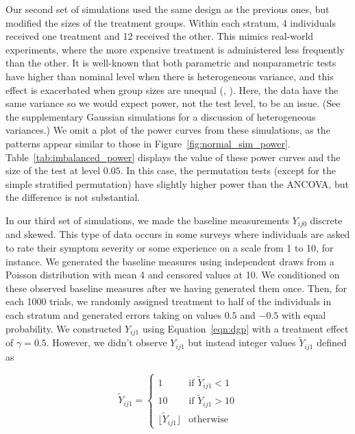 \documentclass[12pt]{article}
\begin{document}
Our second set of simulations used the same design as the previous ones, but modified the sizes of the treatment groups.
Within each stratum, 4 individuals received one treatment and 12 received the other.
This mimics real-world experiments, where the more expensive treatment is administered less frequently than the other.
It is well-known that both parametric and nonparametric tests have higher than nominal level when there is heterogeneous variance, and this effect is exacerbated when group sizes are unequal (\cite{glass_consequences_1972}, \cite{zimmerman_two_2006}).
Here, the data have the same variance so we would expect power, not the test level, to be an issue.
(See the supplementary Gaussian simulations for a discussion of heterogeneous variances.)
We omit a plot of the power curves from these simulations, as the patterns appear similar to those in Figure~\ref{fig:normal_sim_power}.
Table~\ref{tab:imbalanced_power} displays the value of these power curves and the size of the test at level $0.05$.
In this case, the permutation tests (except for the simple stratified permutation) have slightly higher power than the ANCOVA, but the difference is not substantial.
\begin{center}

\end{center}

In our third set of simulations, we made the baseline measurements $Y_{ij0}$ discrete and skewed.
This type of data occurs in some surveys where individuals are asked to rate their symptom severity or some experience on a scale from 1 to 10, for instance.
We generated the baseline measures using independent draws from a Poisson distribution with mean 4 and censored values at 10.
We conditioned on these observed baseline measures after we having generated them once.
Then, for each 1000 trials, we randomly assigned treatment to half of the individuals in each stratum and generated errors taking on values $0.5$ and $-0.5$ with equal probability.
We constructed $Y_{ij1}$ using Equation~\ref{eqn:dgp} with a treatment effect of $\gamma = 0.5$.
However, we didn't observe $Y_{ij1}$ but instead integer values $\tilde{Y}_{ij1}$ defined as 

\begin{displaymath}
   \tilde{Y}_{ij1} = \left\{
     \begin{array}{ll}
       1 & \text{if } \tilde{Y}_{ij1} < 1\\
       10 & \text{if } \tilde{Y}_{ij1} > 10 \\
       \lfloor \tilde{Y}_{ij1} \rfloor & \text{otherwise}
     \end{array}
   \right.
\end{displaymath}
\end{document}
